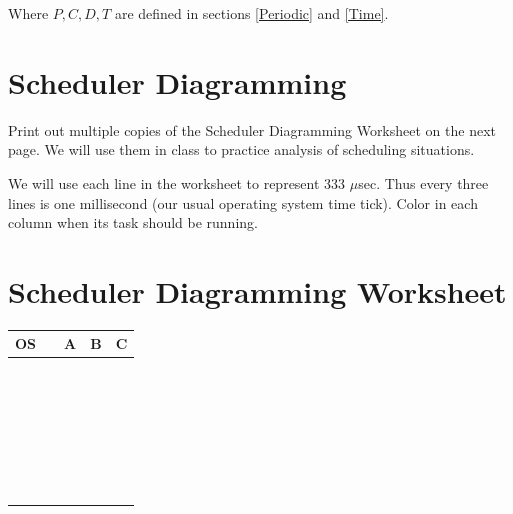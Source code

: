 \documentclass{article}	%
\begin{document}
Where $P,C,D,T$ are defined in sections \ref{Periodic} and \ref{Time}.	%


\section{Scheduler Diagramming}
Print out multiple copies of the Scheduler Diagramming Worksheet on the next page. 
We will use them in class to practice analysis of scheduling situations. 

We will use each line in the worksheet to represent 333 $\mu$sec.  Thus every three lines
is one millisecond (our usual operating system time tick).   Color in each column when
its task should be running. 

\newpage
\section{\large\bf Scheduler Diagramming Worksheet} 
\label{SchedWorksheet}
\renewcommand\arraystretch{1.8}%
\begin{tabular}{|p{1in}|p{0.3in}|p{1in}|p{1in}|p{1in}|}
\hline
OS      &  & A & B & C \\ \hline
        &  &   &   &   \\ \hline
        &  &   &   &   \\ \hline
        &  &   &   &   \\ \hline
        &  &   &   &   \\ \hline
        &  &   &   &   \\ \hline
        &  &   &   &   \\ \hline
        &  &   &   &   \\ \hline
        &  &   &   &   \\ \hline
        &  &   &   &   \\ \hline
        &  &   &   &   \\ \hline
        &  &   &   &   \\ \hline
        &  &   &   &   \\ \hline
        &  &   &   &   \\ \hline
        &  &   &   &   \\ \hline
        &  &   &   &   \\ \hline
        &  &   &   &   \\ \hline
        &  &   &   &   \\ \hline
        &  &   &   &   \\ \hline
        &  &   &   &   \\ \hline
        &  &   &   &   \\ \hline
        &  &   &   &   \\ \hline
        &  &   &   &   \\ \hline
        &  &   &   &   \\ \hline
        &  &   &   &   \\ \hline
        &  &   &   &   \\ \hline
        &  &   &   &   \\ \hline
        &  &   &   &   \\ \hline
        &  &   &   &   \\ \hline
\end{tabular} 
\end{document}

